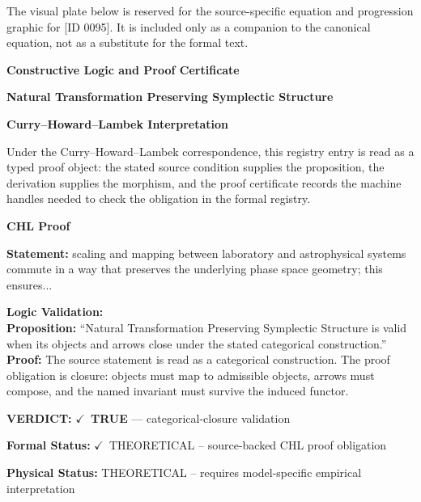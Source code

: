 \begingroup\footnotesize\sloppy
The visual plate below is reserved for the source-specific equation and progression graphic for [ID 0095]. It is included only as a companion to the canonical equation, not as a substitute for the formal text.
\par\endgroup
\ifTZPDarkEdition
{}
\fi

\clearpage
\begingroup\tzpsupportsetup
\noindent\textbf{\fontsize{10.8pt}{12.8pt}\selectfont [ID 0095] Constructive Logic and Proof Certificate}\par
\noindent\textbf{\fontsize{10pt}{12pt}\selectfont Natural Transformation Preserving Symplectic Structure}\par
\vspace{0.45em}
\begingroup
\footnotesize
\setlength{\parskip}{0.22em}
\setlength{\parindent}{0pt}
\noindent\textbf{Curry--Howard--Lambek Interpretation}\par
Under the Curry--Howard--Lambek correspondence, this registry entry is read as a typed proof
object: the stated source condition supplies the proposition, the derivation supplies the
morphism, and the proof certificate records the machine handles needed to check the obligation
in the formal registry.

\vspace{0.45em}
\noindent\textbf{CHL Proof}\par
\textbf{Statement:} scaling and mapping between laboratory and astrophysical systems commute in a way that
preserves the underlying phase space geometry; this ensures...

\textbf{Logic Validation:}\\
\textbf{Proposition:} ``Natural Transformation Preserving Symplectic Structure is valid when its objects and
arrows close under the stated categorical construction.''\\
\textbf{Proof:} The source statement is read as a categorical construction. The proof obligation is
closure: objects must map to admissible objects, arrows must compose, and the named
invariant must survive the induced functor.

\textbf{VERDICT:} \ensuremath{\checkmark}\ \textbf{TRUE} --- categorical-closure validation

\textbf{Formal Status:} \ensuremath{\checkmark}\ THEORETICAL -- source-backed CHL proof obligation

\textbf{Physical Status:} THEORETICAL -- requires model-specific empirical interpretation
\par\vspace{0.45em}
\par
\ifTZPDarkEdition
{}
\fi
\endgroup
\endgroup
